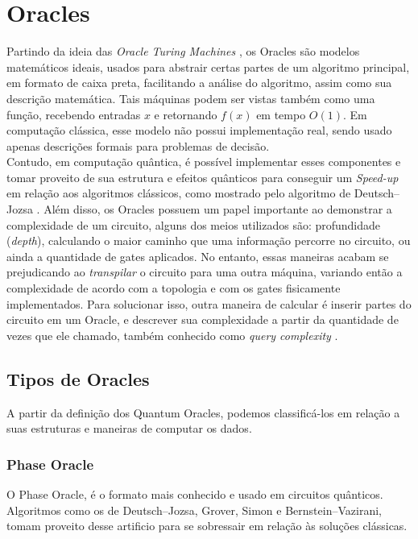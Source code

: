 \documentclass{article}
\begin{document}
\section{Oracles}
Partindo da ideia das \emph{Oracle Turing Machines} \cite{SOARE2009368}\cite{amreen_oracle}\cite{kalyanasyndaram_2021_mod04lec23}\cite{e21080800}, os Oracles são modelos matemáticos ideais, usados para abstrair certas partes de um algoritmo principal, em formato de caixa preta, facilitando a análise do algoritmo, assim como sua descrição matemática. Tais máquinas podem ser vistas também como uma função, recebendo entradas $x$ e retornando $f(x)$ em tempo $O(1)$. Em computação clássica, esse modelo não possui implementação real, sendo usado apenas descrições formais para problemas de decisão.\\
Contudo, em computação quântica, é possível implementar esses componentes e tomar proveito de sua estrutura e efeitos quânticos para conseguir um \emph{Speed-up} em relação aos algoritmos clássicos, como mostrado pelo algoritmo de Deutsch–Jozsa \cite{Fan_2007}. Além disso, os Oracles possuem um papel importante ao demonstrar a complexidade de um circuito, alguns dos meios utilizados são: profundidade (\emph{depth}), calculando o maior caminho que uma informação percorre no circuito, ou ainda a quantidade de gates aplicados. No entanto, essas maneiras acabam se prejudicando ao \emph{transpilar} o circuito para uma outra máquina, variando então a complexidade de acordo com a topologia e com os gates fisicamente implementados. Para solucionar isso, outra maneira de calcular é inserir partes do circuito em um Oracle, e descrever sua complexidade a partir da quantidade de vezes que ele chamado, também conhecido como \emph{query complexity} \cite{odonnell_2015_lecture} \cite{e21080800}.

\subsection{Tipos de Oracles}

A partir da definição dos Quantum Oracles, podemos classificá-los em relação a suas estruturas e maneiras de computar os dados.

\subsubsection{Phase Oracle}

O Phase Oracle, é o formato mais conhecido e usado em circuitos quânticos. Algoritmos como os de  Deutsch–Jozsa, Grover, Simon e Bernstein–Vazirani, tomam proveito desse artificio para se sobressair em relação às soluções clássicas. 
\end{document}
